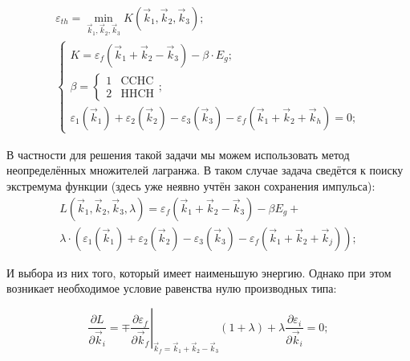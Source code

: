 \documentclass[../main.tex]{subfiles}
\begin{document}
    \begin{equation}
        \begin{array}{l}
            \label{gfunc}
            \varepsilon_{th} = \min_{\vec{k}_1, \vec{k}_2, \vec{k}_3} K (\vec{k}_1, \vec{k}_2, \vec{k}_3);\\
            \begin{cases}
                K  = \varepsilon_f(\vec{k}_1 + \vec{k}_2 - \vec{k}_3) - \beta \cdot E_g;\\
                \beta = \begin{cases}
                            1   & \text{CCHC}\\
                            2   & \text{HHCH}
                        \end{cases};\\
                \varepsilon_1(\vec{k}_1) + \varepsilon_2(\vec{k}_2) - \varepsilon_3(\vec{k}_3) - \varepsilon_f(\vec{k}_1 + \vec{k}_2 + \vec{k}_h) = 0;
            \end{cases}
        \end{array}
    \end{equation}



    
    В частности для решения такой задачи мы можем использовать метод 
    неопределённых множителей лагранжа. В таком случае задача сведётся
    к поиску экстремума функции (здесь уже неявно учтён 
    закон сохранения импульса):
    \begin{multline}
        L (\vec{k}_1,\vec{k}_2,\vec{k}_3, \lambda) = \varepsilon_f(\vec{k}_1 + \vec{k}_2 - \vec{k}_3) - \beta E_g + \\
            \lambda \cdot \left(\varepsilon_1(\vec{k}_1) + 
            \varepsilon_2(\vec{k}_2) - \varepsilon_3(\vec{k}_3) - \varepsilon_f(\vec{k}_1 + \vec{k}_2 + \vec{k}_j)\right);
    \end{multline}

    И выбора из них того, который имеет наименьшую энергию. Однако при этом возникает
    необходимое условие равенства нулю производных типа:

    \begin{equation*}
        \frac{\partial L}{\partial \vec{k}_i} = 
            \mp \left. \frac{\partial \varepsilon_f}{\partial \vec{k}_f}\right\rvert_{\vec{k}_f = \vec{k}_1 + \vec{k}_2 - \vec{k}_3} 
            (1 + \lambda)  + \lambda \frac{\partial \varepsilon_i}{\partial \vec{k}_i} = 0;
    \end{equation*}
\end{document}
